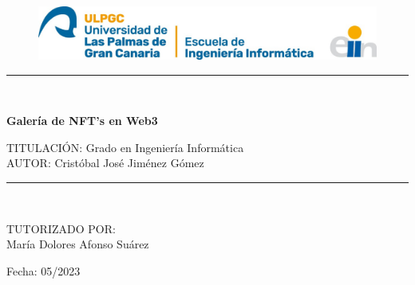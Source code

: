 \begin{titlepage}
    \begin{center}
    \vspace*{0.5in}
        \begin{figure}[htb]
            \begin{center}
            \includegraphics[width=15cm]{Ilustraciones/LogoEII.jpg}
            \end{center}
        \end{figure}

        \vspace*{0.15in}
        \vspace*{0.2in}

        \noindent\hfil\rule{11cm}{0.2mm}\hfil\\
        \vspace*{0.1in}
        \begin{Huge}
            \textbf{Galería de NFT's en Web3} \\
        \end{Huge}

        \vspace*{0.3in}

        \begin{large}
            TITULACIÓN: Grado en Ingeniería Informática \\
            \vspace*{0.1in}
            AUTOR: Cristóbal José Jiménez Gómez \\
        \end{large}
        \vspace*{0.3in}
        
        \noindent\hfil\rule{11cm}{0.2mm}\hfil\\

        \vspace*{0.1in}

        \begin{large}
            TUTORIZADO POR: \\
            María Dolores Afonso Suárez \\
        \end{large}
        
    \vspace*{0.3in}

    Fecha: 05/2023
    \end{center}
\end{titlepage}
